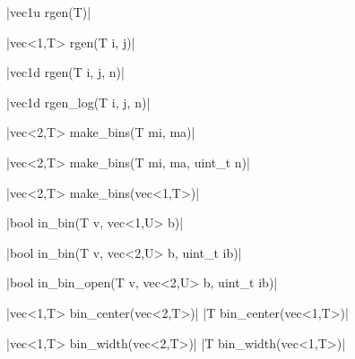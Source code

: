 \item \cppinline|vec1u rgen(T)| 

\cppinline|vec<1,T> rgen(T i, j)|

\cppinline|vec1d rgen(T i, j, n)|

\cppinline|vec1d rgen_log(T i, j, n)| 

\item \cppinline|vec<2,T> make_bins(T mi, ma)| 

\cppinline|vec<2,T> make_bins(T mi, ma, uint_t n)|

\cppinline|vec<2,T> make_bins(vec<1,T>)|

\item \vectorfunc \cppinline|bool in_bin(T v, vec<1,U> b)| 

\vectorfunc \cppinline|bool in_bin(T v, vec<2,U> b, uint_t ib)|

\vectorfunc \cppinline|bool in_bin_open(T v, vec<2,U> b, uint_t ib)| 

\item \cppinline|vec<1,T> bin_center(vec<2,T>)| 
\cppinline|T bin_center(vec<1,T>)|

\item \cppinline|vec<1,T> bin_width(vec<2,T>)| 
\cppinline|T bin_width(vec<1,T>)|
